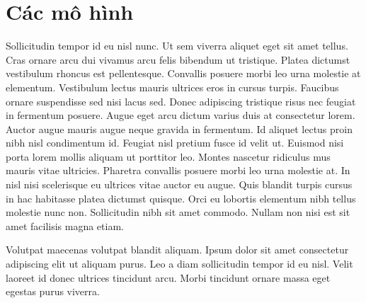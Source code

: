 \section{Các mô hình}
\label{chap:models}

Sollicitudin tempor id eu nisl nunc. Ut sem viverra aliquet eget sit amet
tellus. Cras ornare arcu dui vivamus arcu felis bibendum ut tristique. Platea
dictumst vestibulum rhoncus est pellentesque. Convallis posuere morbi leo urna
molestie at elementum. Vestibulum lectus mauris ultrices eros in cursus turpis.
Faucibus ornare suspendisse sed nisi lacus sed. Donec adipiscing tristique
risus nec feugiat in fermentum posuere. Augue eget arcu dictum varius duis at
consectetur lorem. Auctor augue mauris augue neque gravida in fermentum. Id
aliquet lectus proin nibh nisl condimentum id. Feugiat nisl pretium fusce id
velit ut. Euismod nisi porta lorem mollis aliquam ut porttitor leo. Montes
nascetur ridiculus mus mauris vitae ultricies. Pharetra convallis posuere morbi
leo urna molestie at. In nisl nisi scelerisque eu ultrices vitae auctor eu
augue. Quis blandit turpis cursus in hac habitasse platea dictumst quisque.
Orci eu lobortis elementum nibh tellus molestie nunc non. Sollicitudin nibh sit
amet commodo. Nullam non nisi est sit amet facilisis magna etiam.


Volutpat maecenas volutpat blandit aliquam. Ipsum dolor sit amet consectetur
adipiscing elit ut aliquam purus. Leo a diam sollicitudin tempor id eu nisl.
Velit laoreet id donec ultrices tincidunt arcu. Morbi tincidunt ornare massa
eget egestas purus viverra.